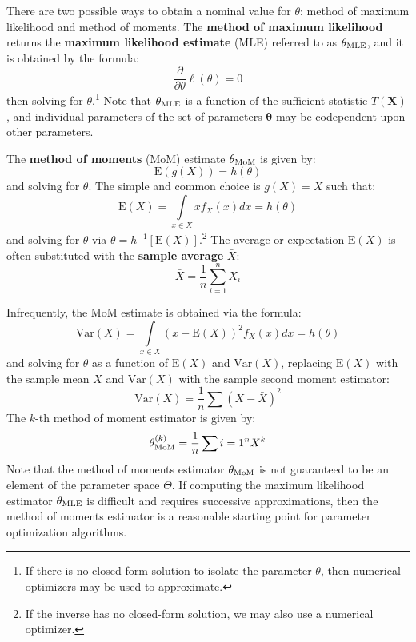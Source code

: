 \documentclass[10pt, a5paper, twoside, openright]{memoir}
\begin{document}
There are two possible ways to obtain a nominal value for $\theta$: method of maximum likelihood and method of moments. The \textbf{method of maximum likelihood} returns the \textbf{maximum likelihood estimate} (MLE) referred to as $\theta_{\textnormal{MLE}}$, and it is obtained by the formula:
$$\frac{\partial}{\partial \theta} \ell (\theta) = 0$$
then solving for $\theta$.\footnote{If there is no closed-form solution to isolate the parameter $\theta$, then numerical optimizers may be used to approximate.} Note that $\theta_{\textnormal{MLE}}$ is a function of the sufficient statistic $T(\boldsymbol X)$, and individual parameters of the set of parameters $\boldsymbol \theta$ may be codependent upon other parameters. 

The \textbf{method of moments} (MoM) estimate $\theta_{\textnormal{MoM}}$ is given by:
$$\mathrm{E}(g(X)) = h(\theta)$$
and solving for $\theta$. The simple and common choice is $g(X) = X$ such that:
$$\mathrm{E}(X) = \int\limits_{x \in X} x f_X(x)dx = h(\theta)$$
and solving for $\theta$ via $\theta = h^{-1}[\mathrm{E}(X) ]$.\footnote{If the inverse has no closed-form solution, we may also use a numerical optimizer.} The average or expectation $\mathrm{E}(X)$ is often substituted with the \textbf{sample average} $\bar X$:
$$\bar X = \frac{1}{n} \sum\limits_{i=1}^n X_i$$

Infrequently, the MoM estimate is obtained via the formula:
$$\mathrm{Var}(X) = \int\limits_{x \in X} (x - \mathrm{E}(X))^2 f_X(x)dx = h(\theta)$$
and solving for $\theta$ as a function of $\mathrm{E}(X)$ and $\mathrm{Var}(X)$, replacing $\mathrm{E}(X)$ with the sample mean $\bar X$ and $\mathrm{Var}(X)$ with the sample second moment estimator:
$$\mathrm{Var}(X) = \frac{1}{n} \sum (X-\bar X)^2$$
The $k$-th method of moment estimator is given by:
$$\theta^{(k)}_{\textnormal{MoM}} = \frac{1}{n} \sum\limits{i=1}^n X^k$$
Note that the method of moments estimator $\theta_{\textnormal{MoM}}$ is not guaranteed to be an element of the parameter space $\Theta$. If computing the maximum likelihood estimator $\theta_{\textnormal{MLE}}$ is difficult and requires successive approximations, then the method of moments estimator is a reasonable starting point for parameter optimization algorithms.
\end{document}
